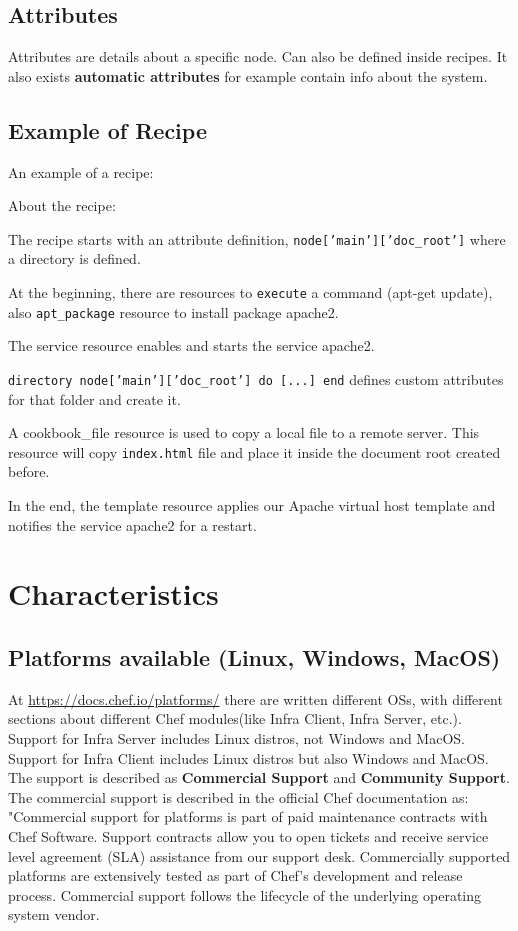 \documentclass[12pt,a4paper,openright,twoside]{book}
\begin{document}
\subsection{Attributes}
Attributes are details about a specific node. Can also be defined inside recipes.
It also exists \textbf{automatic attributes} for example contain info about the system.


\subsection{Example of Recipe}
An example of a recipe\cite{chefDigitalOcean}:



About the recipe:

The recipe starts with an attribute definition, \texttt{node['main']['doc\_root']} where a directory is defined.


At the beginning, there are resources to \texttt{execute} a command (apt-get update), also \texttt{apt\_package} resource to install package apache2.


The service resource enables and starts the service apache2.

\texttt
{directory node['main']['doc\_root'] do [...] end} defines custom attributes for that folder and create it.

A cookbook\_file resource is used to copy a local file to a remote server. This resource will copy \texttt{index.html} file and place it inside the document root created before.


In the end, the template resource applies our Apache virtual host template and notifies the service apache2 for a restart.

\section{Characteristics}

\subsection{Platforms available (Linux, Windows, MacOS)}
At \url{https://docs.chef.io/platforms/} there are written different OSs, with different sections about different Chef modules(like Infra Client, Infra Server, etc.).
Support for Infra Server includes Linux distros, not Windows and MacOS. Support for Infra Client includes Linux distros but also Windows and MacOS.
The support is described as \textbf{Commercial Support} and \textbf{Community Support}.
The commercial support is described in the official Chef documentation as:
"Commercial support for platforms is part of paid maintenance contracts with Chef Software. Support contracts allow you to open tickets and receive service level agreement (SLA) assistance from our support desk. Commercially supported platforms are extensively tested as part of Chef’s development and release process. Commercial support follows the lifecycle of the underlying operating system vendor.
\end{document}
